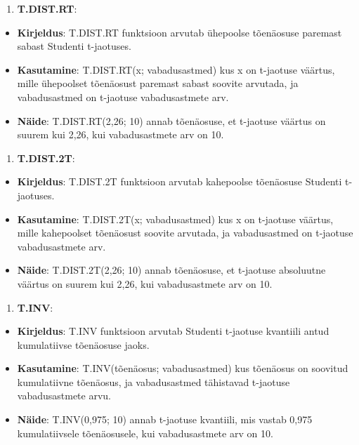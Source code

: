 \documentclass[
]{book}
\providecommand{\tightlist}{%
  \setlength{\itemsep}{0pt}\setlength{\parskip}{0pt}}
\begin{document}
\begin{enumerate}
\def\labelenumi{\arabic{enumi}.}
\setcounter{enumi}{1}
\tightlist
\item
  \textbf{T.DIST.RT}:
\end{enumerate}

\begin{itemize}
\tightlist
\item
  \textbf{Kirjeldus}: T.DIST.RT funktsioon arvutab ühepoolse tõenäosuse paremast sabast Studenti t-jaotuses.
\item
  \textbf{Kasutamine}: T.DIST.RT(x; vabadusastmed) kus x on t-jaotuse väärtus, mille ühepoolset tõenäosust paremast sabast soovite arvutada, ja vabadusastmed on t-jaotuse vabadusastmete arv.
\item
  \textbf{Näide}: T.DIST.RT(2,26; 10) annab tõenäosuse, et t-jaotuse väärtus on suurem kui 2,26, kui vabadusastmete arv on 10.
\end{itemize}

\begin{enumerate}
\def\labelenumi{\arabic{enumi}.}
\setcounter{enumi}{2}
\tightlist
\item
  \textbf{T.DIST.2T}:
\end{enumerate}

\begin{itemize}
\tightlist
\item
  \textbf{Kirjeldus}: T.DIST.2T funktsioon arvutab kahepoolse tõenäosuse Studenti t-jaotuses.
\item
  \textbf{Kasutamine}: T.DIST.2T(x; vabadusastmed) kus x on t-jaotuse väärtus, mille kahepoolset tõenäosust soovite arvutada, ja vabadusastmed on t-jaotuse vabadusastmete arv.
\item
  \textbf{Näide}: T.DIST.2T(2,26; 10) annab tõenäosuse, et t-jaotuse absoluutne väärtus on suurem kui 2,26, kui vabadusastmete arv on 10.
\end{itemize}

\begin{enumerate}
\def\labelenumi{\arabic{enumi}.}
\setcounter{enumi}{3}
\tightlist
\item
  \textbf{T.INV}:
\end{enumerate}

\begin{itemize}
\tightlist
\item
  \textbf{Kirjeldus}: T.INV funktsioon arvutab Studenti t-jaotuse kvantiili antud kumulatiivse tõenäosuse jaoks.
\item
  \textbf{Kasutamine}: T.INV(tõenäosus; vabadusastmed) kus tõenäosus on soovitud kumulatiivne tõenäosus, ja vabadusastmed tähistavad t-jaotuse vabadusastmete arvu.
\item
  \textbf{Näide}: T.INV(0,975; 10) annab t-jaotuse kvantiili, mis vastab 0,975 kumulatiivsele tõenäosusele, kui vabadusastmete arv on 10.
\end{itemize}
\end{document}
